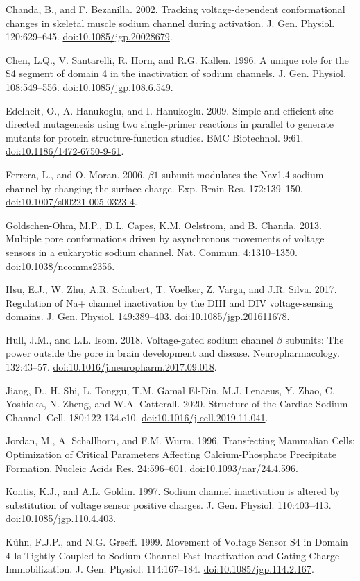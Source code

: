 \begin{hangparas}{.25in}{1}
Chanda, B., and F. Bezanilla. 2002. Tracking voltage-dependent conformational changes in skeletal muscle sodium channel during activation. J. Gen. Physiol. 120:629–645. \url{doi:10.1085/jgp.20028679}.

Chen, L.Q., V. Santarelli, R. Horn, and R.G. Kallen. 1996. A unique role for the S4 segment of domain 4 in the inactivation of sodium channels. J. Gen. Physiol. 108:549–556. \url{doi:10.1085/jgp.108.6.549}.

Edelheit, O., A. Hanukoglu, and I. Hanukoglu. 2009. Simple and efficient site-directed mutagenesis using two single-primer reactions in parallel to generate mutants for protein structure-function studies. BMC Biotechnol. 9:61. \url{doi:10.1186/1472-6750-9-61}.

Ferrera, L., and O. Moran. 2006. $\beta1$-subunit modulates the Nav1.4 sodium channel by changing the surface charge. Exp. Brain Res. 172:139–150. \url{doi:10.1007/s00221-005-0323-4}.

Goldschen-Ohm, M.P., D.L. Capes, K.M. Oelstrom, and B. Chanda. 2013. Multiple pore conformations driven by asynchronous movements of voltage sensors in a eukaryotic sodium channel. Nat. Commun. 4:1310–1350. \url{doi:10.1038/ncomms2356}.

Hsu, E.J., W. Zhu, A.R. Schubert, T. Voelker, Z. Varga, and J.R. Silva. 2017. Regulation of Na+ channel inactivation by the DIII and DIV voltage-sensing domains. J. Gen. Physiol. 149:389–403. \url{doi:10.1085/jgp.201611678}.

Hull, J.M., and L.L. Isom. 2018. Voltage-gated sodium channel $\beta$ subunits: The power outside the pore in brain development and disease. Neuropharmacology. 132:43–57. \url{doi:10.1016/j.neuropharm.2017.09.018}.

Jiang, D., H. Shi, L. Tonggu, T.M. Gamal El-Din, M.J. Lenaeus, Y. Zhao, C. Yoshioka, N. Zheng, and W.A. Catterall. 2020. Structure of the Cardiac Sodium Channel. Cell. 180:122-134.e10. \url{doi:10.1016/j.cell.2019.11.041}.

Jordan, M., A. Schallhorn, and F.M. Wurm. 1996. Transfecting Mammalian Cells: Optimization of Critical Parameters Affecting Calcium-Phosphate Precipitate Formation. Nucleic Acids Res. 24:596–601. \url{doi:10.1093/nar/24.4.596}.

Kontis, K.J., and A.L. Goldin. 1997. Sodium channel inactivation is altered by substitution of voltage sensor positive charges. J. Gen. Physiol. 110:403–413. \url{doi:10.1085/jgp.110.4.403}.

Kühn, F.J.P., and N.G. Greeff. 1999. Movement of Voltage Sensor S4 in Domain 4 Is Tightly Coupled to Sodium Channel Fast Inactivation and Gating Charge Immobilization. J. Gen. Physiol. 114:167–184. \url{doi:10.1085/jgp.114.2.167}.


\end{hangparas}
